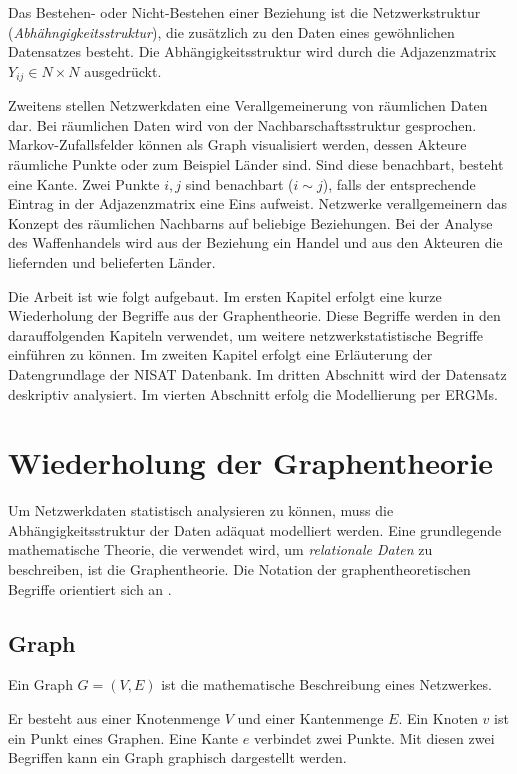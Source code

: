 \documentclass[a4paper,ngerman,oneside,titlepage,bibliography=totoc,11pt]{scrreprt}
\begin{document}
Das Bestehen- oder Nicht-Bestehen einer Beziehung ist die Netzwerkstruktur (\emph{Abhähngigkeitsstruktur}), die zusätzlich zu den Daten eines gewöhnlichen Datensatzes besteht. Die Abhängigkeitsstruktur wird durch die Adjazenzmatrix $Y_{ij} \in N \times N$ ausgedrückt.

Zweitens stellen Netzwerkdaten eine Verallgemeinerung von räumlichen Daten dar. Bei räumlichen Daten wird von der Nachbarschaftsstruktur gesprochen. Markov-Zufallsfelder können als Graph visualisiert werden, dessen Akteure räumliche Punkte oder zum Beispiel Länder sind.
Sind diese benachbart, besteht eine Kante. Zwei Punkte $i, j$ sind benachbart ($i \sim j$), falls der entsprechende Eintrag in der Adjazenzmatrix eine Eins aufweist. Netzwerke verallgemeinern das Konzept des räumlichen Nachbarns auf beliebige Beziehungen. Bei der Analyse des Waffenhandels wird aus der Beziehung ein Handel und aus den Akteuren die liefernden und belieferten Länder.

Die Arbeit ist wie folgt aufgebaut. Im ersten Kapitel erfolgt eine kurze Wiederholung der Begriffe aus der Graphentheorie. Diese Begriffe werden in den darauffolgenden Kapiteln verwendet, um weitere netzwerkstatistische Begriffe einführen zu können. Im zweiten Kapitel erfolgt eine Erläuterung der Datengrundlage der NISAT Datenbank. Im dritten Abschnitt wird der Datensatz deskriptiv analysiert. Im vierten Abschnitt erfolg die Modellierung per ERGMs.





\section{Wiederholung der Graphentheorie}

Um Netzwerkdaten statistisch analysieren zu können, muss die Abhängigkeitsstruktur der Daten adäquat modelliert werden. Eine grundlegende mathematische Theorie, die verwendet wird, um \emph{relationale Daten} zu beschreiben, ist die Graphentheorie. Die Notation der graphentheoretischen Begriffe orientiert sich an \cite{kc14}.

\subsection{Graph}

Ein Graph $G = (V,E)$ ist die mathematische Beschreibung eines Netzwerkes. 

Er besteht aus einer Knotenmenge $V$ und einer Kantenmenge $E$. Ein Knoten $v$ ist ein Punkt eines Graphen. Eine Kante $e$ verbindet zwei Punkte. Mit diesen zwei Begriffen kann ein Graph graphisch dargestellt werden.
\end{document}
